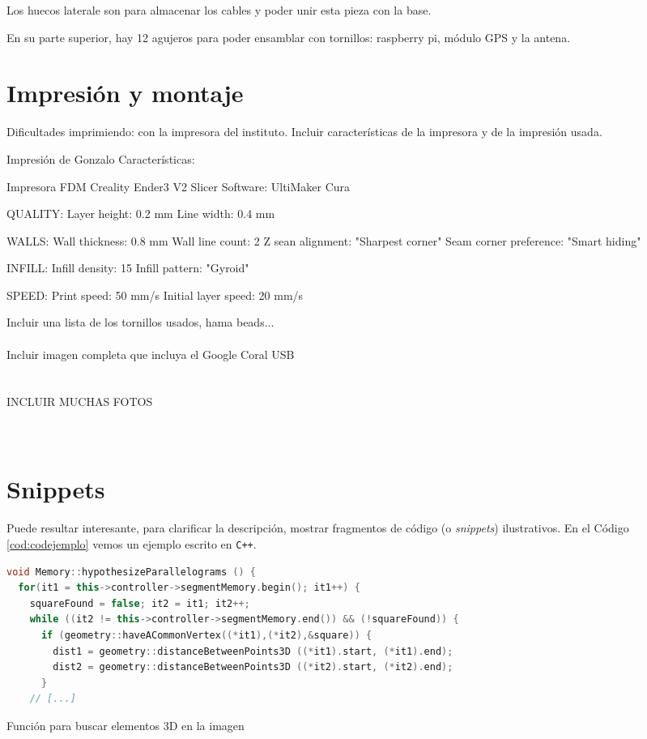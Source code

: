 Los huecos laterale son para almacenar los cables y poder unir esta pieza con la base.

En su parte superior, hay 12 agujeros para poder ensamblar con tornillos: raspberry pi, módulo GPS y la antena.



\section{Impresión y montaje}


Dificultades imprimiendo: con la impresora del instituto. Incluir características de la impresora y de la impresión usada.

Impresión de Gonzalo
Características: 

Impresora FDM Creality Ender3 V2
Slicer Software: UltiMaker Cura

QUALITY:
Layer height: 0.2 mm
Line width: 0.4 mm

WALLS: 
Wall thickness: 0.8 mm
Wall line count: 2
Z sean alignment: "Sharpest corner"
Seam corner preference: "Smart hiding"

INFILL:
Infill density: 15%
Infill pattern: "Gyroid"

SPEED:
Print speed: 50 mm/s
Initial layer speed: 20 mm/s


Incluir una lista de los tornillos usados, hama  beads...\\\\



Incluir imagen completa que incluya el Google Coral USB\\\\\\


INCLUIR MUCHAS FOTOS\\\\\\


\section{Snippets}

Puede resultar interesante, para clarificar la descripción, mostrar fragmentos de código (o \textit{snippets}) ilustrativos. En el Código \ref{cod:codejemplo} vemos un ejemplo escrito en \texttt{C++}.

\begin{code}[h]
\begin{lstlisting}[language=C++]
void Memory::hypothesizeParallelograms () {
  for(it1 = this->controller->segmentMemory.begin(); it1++) {
    squareFound = false; it2 = it1; it2++;
    while ((it2 != this->controller->segmentMemory.end()) && (!squareFound)) {
      if (geometry::haveACommonVertex((*it1),(*it2),&square)) {
        dist1 = geometry::distanceBetweenPoints3D ((*it1).start, (*it1).end);
        dist2 = geometry::distanceBetweenPoints3D ((*it2).start, (*it2).end);
      }
    // [...]
\end{lstlisting}
\caption[Función para buscar elementos 3D en la imagen]{Función para buscar elementos 3D en la imagen}
\label{cod:codejemplo}
\end{code}

